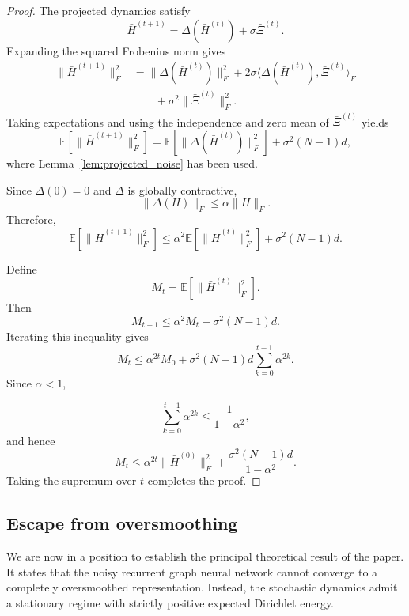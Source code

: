 \documentclass{article}
\begin{document}
\begin{proof}
	
	The projected dynamics satisfy	
	\[
	\bar H^{(t+1)}
	=
	\Delta(\bar H^{(t)})
	+
	\sigma\bar\Xi^{(t)}.
	\]
	Expanding the squared Frobenius norm gives	
	\[
	\begin{aligned}
		\|\bar H^{(t+1)}\|_F^2
		&=
		\|\Delta(\bar H^{(t)})\|_F^2
		+
		2\sigma
		\langle
		\Delta(\bar H^{(t)}),
		\bar\Xi^{(t)}
		\rangle_F
		\\
		&\qquad
		+
		\sigma^2
		\|\bar\Xi^{(t)}\|_F^2.
	\end{aligned}
	\]
	Taking expectations and using the independence and zero mean of
	\(\bar\Xi^{(t)}\) yields	
	\[
	\mathbb E
	\!\left[
	\|\bar H^{(t+1)}\|_F^2
	\right]
	=
	\mathbb E
	\!\left[
	\|\Delta(\bar H^{(t)})\|_F^2
	\right]
	+
	\sigma^2 (N-1)d,
	\]	
	where Lemma~\ref{lem:projected_noise} has been used.
	
	Since
	\(\Delta(0)=0\)
	and
	\(\Delta\)
	is globally contractive,	
	\[
	\|\Delta(H)\|_F
	\le
	\alpha
	\|H\|_F.
	\]	
	Therefore,	
	\[
	\mathbb E
	\!\left[
	\|\bar H^{(t+1)}\|_F^2
	\right]
	\le
	\alpha^2
	\mathbb E
	\!\left[
	\|\bar H^{(t)}\|_F^2
	\right]
	+
	\sigma^2 (N-1)d.
	\]
	
	Define	
	\[
	M_t
	=
	\mathbb E
	\!\left[
	\|\bar H^{(t)}\|_F^2
	\right].
	\]
	Then	
	\[
	M_{t+1}
	\le
	\alpha^2 M_t
	+
	\sigma^2 (N-1)d.
	\]
	Iterating this inequality gives
	\[
	M_t
	\le
	\alpha^{2t}M_0
	+
	\sigma^2 (N-1)d
	\sum_{k=0}^{t-1}
	\alpha^{2k}.
	\]
	Since
	\(\alpha<1\),
	
	\[
	\sum_{k=0}^{t-1}
	\alpha^{2k}
	\le
	\frac{1}{1-\alpha^2},
	\]
	and hence	
	\[
	M_t
	\le
	\alpha^{2t}
	\|\bar H^{(0)}\|_F^2
	+
	\frac{\sigma^2 (N-1)d}
	{1-\alpha^2}.
	\]
	Taking the supremum over
	\(t\)
	completes the proof.
	
\end{proof}


\subsection{Escape from oversmoothing}
\label{sec:escape}

We are now in a position to establish the principal theoretical result
of the paper.
It states that the noisy recurrent graph neural network cannot converge
to a completely oversmoothed representation.
Instead, the stochastic dynamics admit a stationary regime with strictly
positive expected Dirichlet energy.
\end{document}
